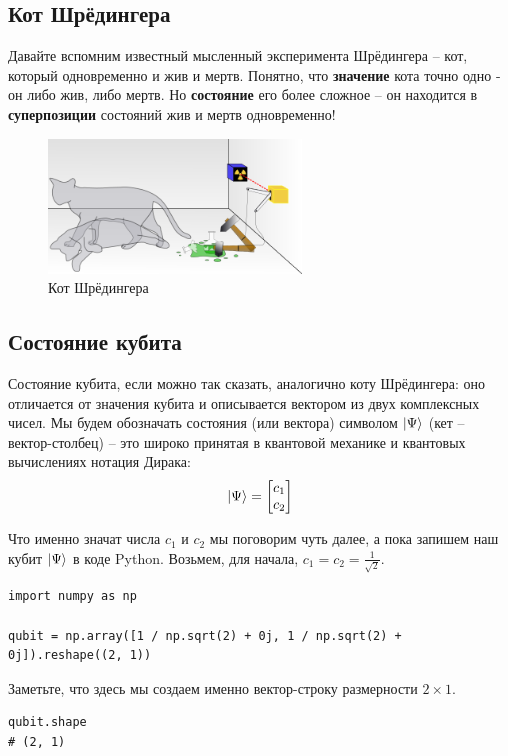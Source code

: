\documentclass[11pt]{article}
\begin{document}
\subsection{Кот Шрёдингера}
\label{sec:org989debc}
Давайте вспомним известный мысленный эксперимента Шрёдингера -- кот, который одновременно и жив и мертв. Понятно, что \textbf{значение} кота точно одно - он либо жив, либо мертв. Но \textbf{состояние} его более сложное -- он находится в \textbf{суперпозиции} состояний жив и мертв одновременно!

\begin{center}
\begin{figure}[htbp]
\centering
\includegraphics[width=0.6\textwidth]{./images/Schrodingers_cat.svg.png}
\caption{Кот Шрёдингера}
\end{figure}
\end{center}

\subsection{Состояние кубита}
\label{sec:org09c6180}
Состояние кубита, если можно так сказать, аналогично коту Шрёдингера: оно отличается от значения кубита и описывается вектором из двух комплексных чисел. Мы будем обозначать состояния (или вектора) символом \(\ket{\Psi}\) (кет -- вектор-столбец) -- это широко принятая в квантовой механике и квантовых вычислениях нотация Дирака:
\begin{align*}
\ket{\Psi} = \begin{bmatrix}
c_1 \\
c_2
\end{bmatrix}
\end{align*}

Что именно значат числа \(c_1\) и \(c_2\) мы поговорим чуть далее, а пока запишем наш кубит \(\ket{\Psi}\) в коде Python. Возьмем, для начала, \(c_1 = c_2 = \frac{1}{\sqrt{2}}\).

\begin{verbatim}
import numpy as np

qubit = np.array([1 / np.sqrt(2) + 0j, 1 / np.sqrt(2) + 0j]).reshape((2, 1))
\end{verbatim}
Заметьте, что здесь мы создаем именно вектор-строку размерности \(2\times1\).
\begin{verbatim}
qubit.shape
# (2, 1)
\end{verbatim}
\end{document}
